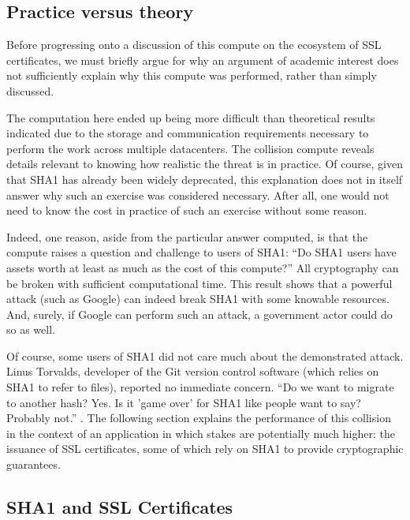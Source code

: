 \documentclass[sigconf]{acmart}
\begin{document}
\subsection{Practice versus theory}
\label{sec:orgec82998}

Before progressing onto a discussion of this compute on the ecosystem of SSL certificates,
we must briefly argue for why an argument of academic interest does not sufficiently explain why this compute was performed, rather than simply discussed.

The computation here ended up being more difficult than theoretical results indicated due to the storage and communication requirements necessary to perform the work across multiple datacenters. 
The collision compute reveals details relevant
to knowing how realistic the threat is in practice. 
Of course, given that SHA1 has already been widely deprecated, this explanation does not in itself answer why such an exercise was considered necessary.
After all, one would not need to know the cost in practice of such an exercise without some reason.

Indeed, one reason, aside from the particular answer computed, is that the compute raises a question and challenge to users of SHA1:
``Do SHA1 users have assets worth at least as much as the cost of this compute?''
All cryptography can be broken with sufficient computational time.
This result shows that a powerful attack (such as Google) can indeed break SHA1 with some knowable resources.
And, surely, if Google can perform such an attack, a government actor could do so as well.

Of course, some users of SHA1 did not care much about the demonstrated attack.
Linus Torvalds, developer of the Git version control software (which relies on SHA1 to refer to files), reported no immediate concern.
``Do we want to migrate to another hash? Yes. Is it 'game over' for SHA1 like people want to say? Probably not.'' \cite{Torvalds2017}.
The following section explains the performance of this collision in the context of 
an application in which stakes are potentially much higher:
the issuance of SSL certificates, some of which rely on SHA1 to provide cryptographic guarantees.

\subsection{SHA1 and SSL Certificates}
\label{sec:orgf029e6f}
\end{document}
